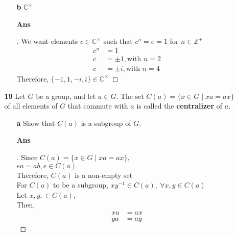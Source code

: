 \documentclass[paper=usletter, fontsize=12pt]{article}
\begin{document}
\begin{itemize}
\begin{itemize}
\begin{enumerate}
                \item[\textbf{b}] $\mathbb{C}^{\times}$
                \item[\textbf{Ans}]
                \begin{proof}[\unskip\nopunct]
                    We want elements $c \in \mathbb{C}^{\times}$ such that $c^n
                    =e=1$ for $n \in \mathbb{Z}^{+}$
                    \begin{align*}
                        c^n & = 1 \\
                        c & = \pm 1, \text{with } n = 2 \\
                        c & = \pm i, \text{with } n = 4
                    \end{align*}
                    Therefore, $\{-1, 1, -i, i\} \in \mathbb{C}^{\times}$ \qedhere
                \end{proof}
                \vspace{0.2in}

            \end{enumerate}

            \item[\textbf{19}] Let $G$ be a group, and let $a \in G$. The set
            $C(a) = \{ x \in G \mid xa = ax \}$ of all elements of $G$ that
            commute with $a$ is called the \textbf{centralizer} of $a$.
            \begin{enumerate}

                \item[\textbf{a}] Show that $C(a)$ is a subgroup of $G$.
                \item[\textbf{Ans}]
                \begin{proof}[\unskip\nopunct]
                    Since $C(a) = \{ x \in G \mid xa = ax \}$,\\
                    $ea = ab, e \in C(a)$\\
                    Therefore, $C(a)$ is a non-empty set\\
                    For $C(a)$ to be a subgroup, $xy^{-1} \in C(a), \ \forall x,y \in C(a)$\\
                    Let $x,y, \in C(a)$,\\
                    Then,
                    \begin{align*}
                        xa & = ax \\
                        ya & = ay
                    \end{align*}


\end{proof}
\end{enumerate}
\end{itemize}
\end{itemize}
\end{document}
